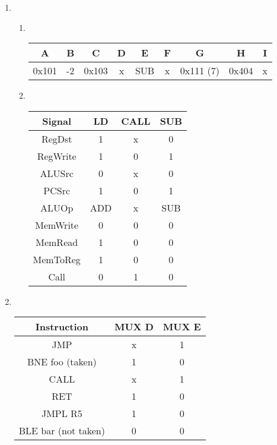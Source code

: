 \documentclass{article}
\begin{document}
\begin{enumerate}
  
\item
  \begin{enumerate}
  \item\hfill\\
    \begin{tabular}{|c|c|c|c|c|c|c|c|c|}
      \hline
      A & B & C & D & E & F & G & H & I\\
      \hline
      0x101 & -2 & 0x103 & x & SUB & x & 0x111 (7) & 0x404 & x\\
      \hline
    \end{tabular}
  \item \hfill\\
    \begin{tabular}{|c|c|c|c|}
      \hline
      Signal & LD & CALL & SUB\\
      \hline
      RegDst & 1 & x & 0\\
      \hline
      RegWrite & 1 & 0 & 1\\
      \hline
      ALUSrc & 0 & x & 0\\
      \hline
      PCSrc & 1 & 0 & 1\\
      \hline
      ALUOp & ADD & x & SUB \\
      \hline
      MemWrite & 0 & 0 & 0 \\
      \hline
      MemRead & 1 & 0 & 0\\
      \hline
      MemToReg & 1 & 0 & 0\\
      \hline
      Call & 0 & 1 & 0 \\
      \hline
    \end{tabular}
  \end{enumerate}
  
\item\hfill\\
  \begin{tabular}{|c|c|c|}
    \hline
    Instruction & MUX D & MUX E\\
    \hline
    JMP & x & 1\\
    \hline
    BNE foo (taken) & 1 & 0\\
    \hline
    CALL & x & 1 \\
    \hline
    RET & 1 & 0\\
    \hline
    JMPL R5 & 1 & 0\\
    \hline
    BLE bar (not taken) & 0 & 0\\
    \hline
  \end{tabular}
\end{enumerate}
\end{document}
